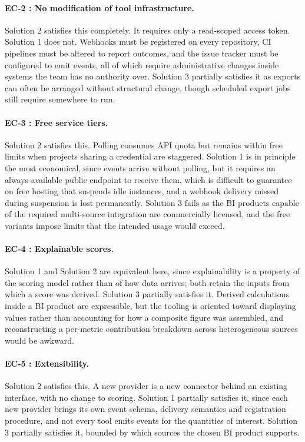 \paragraph{EC-2 : No modification of tool infrastructure.}
Solution 2 satisfies this completely. It requires only a read-scoped access token. Solution 1
does not. Webhooks must be registered on every repository, CI pipelines must be
altered to report outcomes, and the issue tracker must be configured to emit
events, all of which require administrative changes inside systems the team
has no authority over. Solution 3 partially satisfies it as exports can often be arranged without
structural change, though scheduled export jobs still require somewhere to run.

\paragraph{EC-3 : Free service tiers.}
Solution 2 satisfies this. Polling consumes API quota but remains within free limits when
projects sharing a credential are staggered. Solution 1 is in principle the most
economical, since events arrive without polling, but it requires an
always-available public endpoint to receive them, which is difficult to
guarantee on free hosting that suspends idle instances, and a webhook delivery
missed during suspension is lost permanently. Solution 3 fails as the BI products capable
of the required multi-source integration are commercially licensed, and the
free variants impose limits that the intended usage would exceed.

\paragraph{EC-4 : Explainable scores.}
Solution 1 and Solution 2 are equivalent here, since explainability is a property of the scoring
model rather than of how data arrives; both retain the inputs from which a score
was derived. Solution 3 partially satisfies it. Derived calculations inside a BI product
are expressible, but the tooling is oriented toward displaying values rather than
accounting for how a composite figure was assembled, and reconstructing a
per-metric contribution breakdown across heterogeneous sources would be awkward.

\paragraph{EC-5 : Extensibility.}
Solution 2 satisfies this. A new provider is a new connector behind an existing
interface, with no change to scoring. Solution 1 partially satisfies it, since each new
provider brings its own event schema, delivery semantics and registration
procedure, and not every tool emits events for the quantities of interest. Solution 3
partially satisfies it, bounded by which sources the chosen BI product supports.

